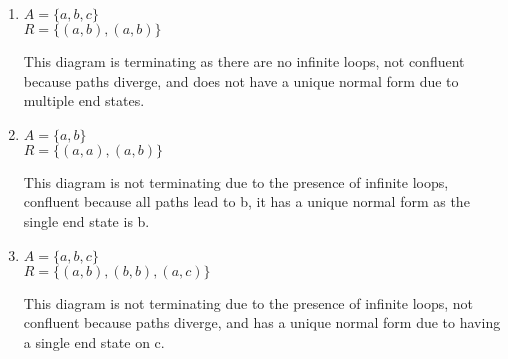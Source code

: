 \documentclass{article}
\begin{document}
\begin{enumerate}
\vspace{6em}

    \item $A = \{ a, b, c \}$ \\
    \hspace*{1em} $R = \{ (a,b), (a,b) \}$
    \begin{center}
    \end{center}
    This diagram is terminating as there are no infinite loops, not confluent because paths diverge, and does not have a unique normal form due to multiple end states.

\vspace{4em}

    \item $A = \{ a, b \}$ \\
    \hspace*{1em} $R = \{ (a,a), (a,b) \}$
    \begin{center}
    \end{center}
    This diagram is not terminating due to the presence of infinite loops, confluent because all paths lead to b, it has a unique normal form as the single end state is b.

\vspace{4em}

    \item $A = \{ a, b, c \}$ \\
    \hspace*{1em} $R = \{ (a,b), (b,b), (a,c) \}$
    \begin{center}
    \end{center}
    This diagram is not terminating due to the presence of infinite loops, not confluent because paths diverge, and has a unique normal form due to having a single end state on c.


\end{enumerate}
\end{document}
